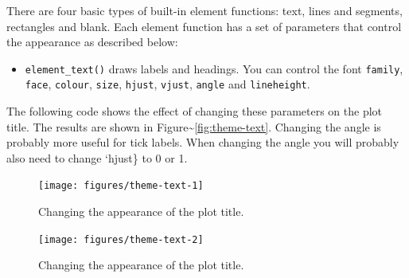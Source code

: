 There are four basic types of built-in element functions: text, lines
and segments, rectangles and blank. Each element function has a set of
parameters that control the appearance as described below:

\begin{itemize}
\itemsep1pt\parskip0pt
\item
  \texttt{element\_text()} draws labels and headings. You can control
  the font \texttt{family}, \texttt{face}, \texttt{colour},
  \texttt{size}, \texttt{hjust}, \texttt{vjust}, \texttt{angle} and
  \texttt{lineheight}.  
\end{itemize}

The following code shows the effect of changing these parameters on the
plot title. The results are shown in
Figure\textasciitilde{}\ref{fig:theme-text}. Changing the angle is
probably more useful for tick labels. When changing the angle you will
probably also need to change `hjust\} to 0 or 1.

\begin{Shaded}
\begin{Highlighting}[]
\StringTok{ }\StringTok{ }\NormalTok{(} \NormalTok{)}
\end{Highlighting}
\end{Shaded}

\begin{figure}
\texttt{[image: figures/theme-text-1]} \caption{Changing the appearance of the plot title.\label{fig:theme-text1}}
\end{figure}

\begin{Shaded}
\begin{Highlighting}[]
\StringTok{ }\NormalTok{(} \NormalTok{(} \NormalTok{))}
\end{Highlighting}
\end{Shaded}

\begin{figure}
\texttt{[image: figures/theme-text-2]} \caption{Changing the appearance of the plot title.\label{fig:theme-text2}}
\end{figure}

\begin{Shaded}
\begin{Highlighting}[]
\StringTok{ }\NormalTok{(} 
              \NormalTok{(} \NormalTok{, } \NormalTok{))}
\end{Highlighting}
\end{Shaded}


